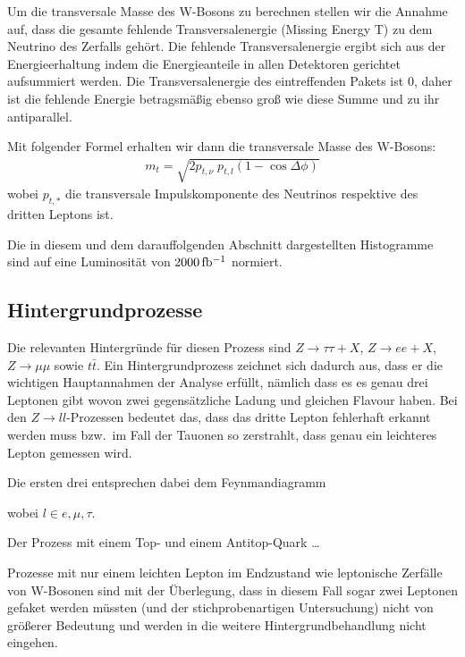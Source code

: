 Um die transversale Masse des W-Bosons zu berechnen stellen wir die Annahme auf,
dass die gesamte fehlende Transversalenergie (Missing Energy T) zu dem Neutrino
des Zerfalls gehört. Die fehlende Transversalenergie ergibt sich aus der
Energieerhaltung indem die Energieanteile in allen Detektoren gerichtet
aufsummiert werden. Die Transversalenergie des eintreffenden Pakets ist $0$,
daher ist die fehlende Energie betragsmäßig ebenso groß wie diese Summe und zu
ihr antiparallel.

Mit folgender Formel erhalten wir dann die transversale Masse des W-Bosons: 
\begin{align}
  m_t = \sqrt{2 p_{t,\nu}\; p_{t,l} (1 - \cos{\Delta\phi})}
  \label{eqn:trans}
\end{align}
wobei $p_{t,*}$ die transversale Impulskomponente des Neutrinos respektive des
dritten Leptons ist.


Die in diesem und dem darauffolgenden Abschnitt dargestellten Histogramme sind
auf eine Luminosität von $\unit[2000]{fb^{-1}}$ normiert.

\subsection{Hintergrundprozesse}
Die relevanten Hintergründe für diesen Prozess sind $Z\to\tau\tau + X$, $Z\to e
e + X$, $Z\to\mu\mu$ sowie $t\bar{t}$. Ein Hintergrundprozess zeichnet sich
dadurch aus, dass er die wichtigen Hauptannahmen der Analyse erfüllt, nämlich
dass es es genau drei Leptonen gibt wovon zwei gegensätzliche Ladung und
gleichen Flavour haben. Bei den $Z\to l l$-Prozessen bedeutet das, dass das
dritte Lepton fehlerhaft erkannt werden muss bzw.\ im Fall der Tauonen so
zerstrahlt, dass genau ein leichteres Lepton gemessen wird.


Die ersten drei entsprechen dabei dem
Feynmandiagramm
\begin{figure}[h!]
  \begin{center}
%    
  \end{center}
\end{figure}
wobei $l \in {e,\mu,\tau}$. 

Der Prozess mit einem Top- und einem Antitop-Quark \dots

Prozesse mit nur einem leichten Lepton im Endzustand wie leptonische Zerfälle
von W-Bosonen sind mit der Überlegung, dass in diesem Fall sogar zwei Leptonen
gefaket werden müssten (und der stichprobenartigen Untersuchung) nicht von
größerer Bedeutung und werden in die weitere Hintergrundbehandlung nicht
eingehen.

